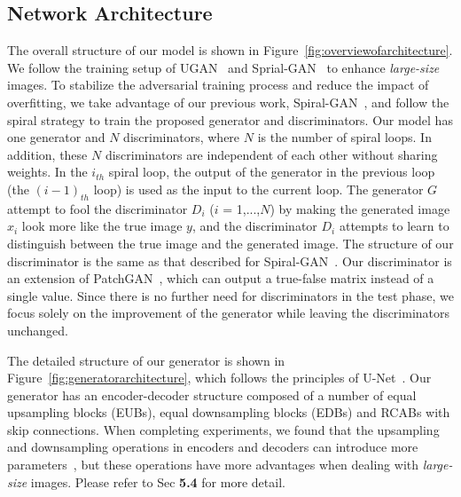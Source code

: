 \documentclass[utf8]{FrontiersinHarvard} %
\begin{document}
\subsection{Network Architecture}
The overall structure of our model is shown in Figure~\ref{fig:overviewofarchitecture}. {We follow the training setup of UGAN~\citep{8460552} and Sprial-GAN~\citep{2020Underwater} to enhance \textit{large-size} images.} To stabilize the adversarial training process and reduce the impact of overfitting, we take advantage of our previous work, Spiral-GAN~\citep{2020Underwater}, and follow the spiral strategy to train the proposed generator and discriminators. Our model has one generator and $N$ discriminators, where $N$ is the number of spiral loops. In addition, these $N$ discriminators are independent of each other without sharing weights. In the $i_{th}$ spiral loop, the output of the generator in the previous loop (the $(i-1)_{th}$ loop) is used as the input to the current loop. The generator $G$ attempt to fool the discriminator $D_{i}$ ($i$ = 1,...,$N$) by making the generated image $x_{i}$ look more like the true image $y$, and the discriminator $D_{i}$ attempts to learn to distinguish between the true image and the generated image. The structure of our discriminator is the same as that described for Spiral-GAN~\citep{2020Underwater}. Our discriminator is an extension of PatchGAN~\citep{8100115}, which can output a true-false matrix instead of a single value. Since there is no further need for discriminators in the test phase, we focus solely on the improvement of the generator while leaving the discriminators unchanged. 

The detailed structure of our generator is shown in Figure~\ref{fig:generatorarchitecture}, which follows
the principles of U-Net~\citep{2015U}. Our generator has an encoder-decoder structure composed of a number of equal upsampling blocks (EUBs), equal downsampling blocks (EDBs) and RCABs with skip connections. When completing experiments, we found that the upsampling and downsampling operations in encoders and decoders can introduce more parameters~\citep{2021LAFFNet}, but these operations have more advantages when dealing with \textit{large-size} images. Please refer to Sec \textbf{5.4} for more detail.
\end{document}
